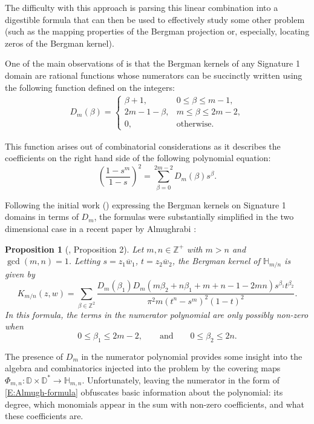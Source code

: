 \documentclass[letterpaper,11pt,reqno]{amsart}
\theoremstyle{plain}
\newtheorem{proposition}[equation]{Proposition}
\theoremstyle{definition}
\theoremstyle{remark}
\theoremstyle{remark}
\numberwithin{equation}{section}
\newcommand{\ol}{\overline}
\newcommand{\D}{{\mathbb D}}
\newcommand{\h}{{\mathbb H}}
\newcommand{\Z}{{\mathbb Z}}
\begin{document}
The difficulty with this approach is parsing this linear combination into a digestible formula that can then be used to effectively study some other problem (such as the mapping properties of the Bergman projection or, especially, locating zeros of the Bergman kernel).

One of the main observations of \cite{CKMM20} is that the Bergman kernels of any Signature 1 domain are rational functions whose numerators can be succinctly written using the following function defined on the integers:
\begin{align}\label{E:Dbasic_def}
D_m(\beta) 
= \begin{cases}
\beta + 1, & 0 \leq \beta \leq m - 1, \\
2m - 1 - \beta, & m \leq \beta \leq 2m - 2, \\
0, & \mathrm{otherwise}.
\end{cases}
\end{align}

This function arises out of combinatorial considerations as it describes the coefficients on the right hand side of the following polynomial equation:
\begin{equation*}
\left( \frac{1-s^m}{1-s} \right)^2 = \sum_{\beta=0}^{2m-2} D_m(\beta) s^\beta.
\end{equation*}

Following the initial work (\cite{CKMM20}) expressing the Bergman kernels on Signature 1 domains in terms of $D_m$, the formulas were substantially simplified in the two dimensional case in a recent paper by Almughrabi \cite{Almugh23}:

\begin{proposition}[\cite{Almugh23}, Proposition 2]\label{T:Almugh-formula}
Let $m,n \in \Z^+$ with $m > n$ and $\gcd(m,n)=1$.
Letting $s = z_1\ol{w}_1$, $t = z_2\ol{w}_2$, the Bergman kernel of $\h_{m/n}$ is given by 
\begin{equation}\label{E:Almugh-formula}
K_{m/n}(z,w) = \sum_{\beta \in \Z^2} \frac{D_m(\beta_1) D_m(m\beta_2 + n\beta_1+m+n-1-2mn)s^{\beta_1}t^{\beta_2}}{\pi^2 m (t^n - s^m)^2(1-t)^2}.
\end{equation}
In this formula, the terms in the numerator polynomial are only possibly non-zero when 
\begin{equation}\label{E:two-ineqs}
0\le\beta_1\le 2m-2, \qquad \mathrm{and} \qquad 0\le\beta_2\le 2n.
\end{equation}
\end{proposition}

The presence of $D_m$ in the numerator polynomial provides some insight into the algebra and combinatorics injected into the problem by the covering maps $\Phi_{m,n} : \D \times \D^* \to \h_{m,n}$.
Unfortunately, leaving the numerator in the form of \eqref{E:Almugh-formula} obfuscates basic information about the polynomial: its degree, which monomials appear in the sum with non-zero coefficients, and what these coefficients are.
\end{document}
